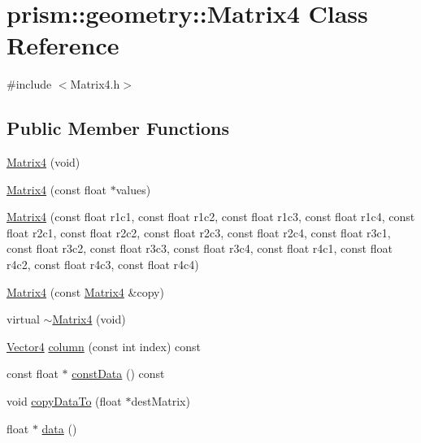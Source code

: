 \hypertarget{classprism_1_1geometry_1_1_matrix4}{}\section{prism\+:\+:geometry\+:\+:Matrix4 Class Reference}
\label{classprism_1_1geometry_1_1_matrix4}


{\ttfamily \#include $<$Matrix4.\+h$>$}

\subsection*{Public Member Functions}
\begin{DoxyCompactItemize}
\item 
\hyperlink{classprism_1_1geometry_1_1_matrix4_a59e58127677eec56304135cae6beb531}{Matrix4} (void)
\item 
\hyperlink{classprism_1_1geometry_1_1_matrix4_a4901303fd12c9356a7796b876f5bb66f}{Matrix4} (const float $\ast$values)
\item 
\hyperlink{classprism_1_1geometry_1_1_matrix4_a03d3bd902689df5e7da131b9a12a5fcf}{Matrix4} (const float r1c1, const float r1c2, const float r1c3, const float r1c4, const float r2c1, const float r2c2, const float r2c3, const float r2c4, const float r3c1, const float r3c2, const float r3c3, const float r3c4, const float r4c1, const float r4c2, const float r4c3, const float r4c4)
\item 
\hyperlink{classprism_1_1geometry_1_1_matrix4_a7503afdc5252c5d664fb1848126c4c72}{Matrix4} (const \hyperlink{classprism_1_1geometry_1_1_matrix4}{Matrix4} \&copy)
\item 
virtual \hyperlink{classprism_1_1geometry_1_1_matrix4_a8d2880084113509726be0ab7a3b60ee7}{$\sim$\+Matrix4} (void)
\item 
\hyperlink{classprism_1_1geometry_1_1_vector4}{Vector4} \hyperlink{classprism_1_1geometry_1_1_matrix4_a8ad13bf4841dd97f0a49f9587c509845}{column} (const int index) const 
\item 
const float $\ast$ \hyperlink{classprism_1_1geometry_1_1_matrix4_ac6e44aa8ca27411a4d924a8daaffd5cb}{const\+Data} () const 
\item 
void \hyperlink{classprism_1_1geometry_1_1_matrix4_a23ecfb0202dcfbafdca5fb5dd067c487}{copy\+Data\+To} (float $\ast$dest\+Matrix)
\item 
float $\ast$ \hyperlink{classprism_1_1geometry_1_1_matrix4_a48a4d24318eea0510ae8b46888d335dd}{data} ()
\item 

\end{DoxyCompactItemize}
